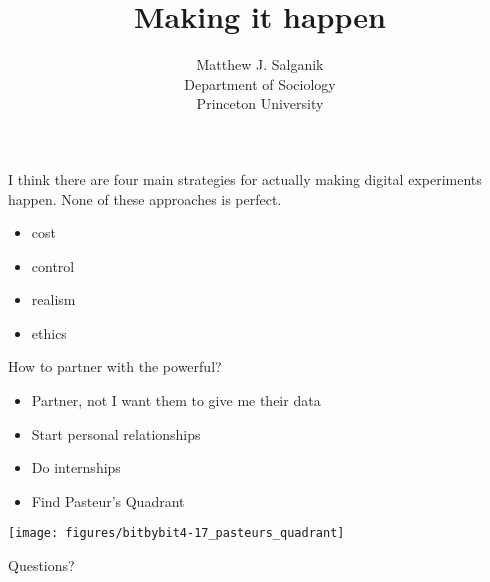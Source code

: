 \documentclass[aspectratio=169]{beamer}
\title[]{Making it happen}
\author[]{Matthew J. Salganik\\Department of Sociology\\Princeton University}
\date[]{Summer Institute in Computational Social Science\\June 23, 2018
\vfill
\begin{flushleft}
{\scriptsize
The Summer Institute in Computational Social Science is supported by grants from the Russell Sage Foundation and the Alfred P. Sloan Foundation.}
\end{flushleft}
\begin{flushright}
\texttt{[image: figures/cc-by.png]}
\end{flushright}
}
\begin{document}
\frame{\titlepage}
\begin{frame}

I think there are four main strategies for actually making digital experiments happen.  None of these approaches is perfect.
\begin{itemize}
\item cost
\pause
\item control
\pause
\item realism
\pause
\item ethics
\end{itemize}

\end{frame}
\begin{frame}

\begin{center}
\end{center}

\end{frame}
\begin{frame}

How to partner with the powerful?

\end{frame}
\begin{frame}

\begin{itemize}
\item Partner, not I want them to give me their data
\pause
\item Start personal relationships
\pause
\item Do internships
\pause
\item Find Pasteur's Quadrant
\end{itemize}

\end{frame}
\begin{frame}

\begin{center}
\texttt{[image: figures/bitbybit4-17\_pasteurs\_quadrant]}
\end{center}

\end{frame}
\begin{frame}

\begin{center}
\end{center}

\end{frame}
\begin{frame}

\begin{center}
\LARGE Questions?
\end{center}

\end{frame}
\end{document}
